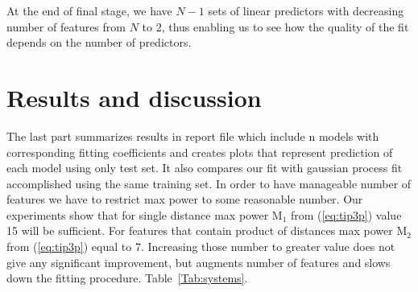 \documentclass[aps,prl,reprint,amsmath,amssymb,nature]{revtex4-1}
\begin{document}
At the end of final stage, we have $N-1$ sets of linear predictors with decreasing number of features from $N$ to 2, thus enabling us to see how the quality of the fit depends on the number of predictors.



\section{Results and discussion}

The last part summarizes results in report file which include n models 
with corresponding fitting coefficients and creates plots that represent 
prediction of each model using only test set. It also compares our fit 
with gaussian process fit accomplished using the same training set. In 
order to have manageable number of features we have to restrict max power to some reasonable number. Our experiments show that for single distance max power M$_{1}$ from (\ref{eq:tip3p}) value 15 will be sufficient. For features that contain product of distances max power M$_{2}$ from (\ref{eq:tip3p}) 
equal to 7. Increasing those number to greater value does not give any 
significant improvement, but augments number of features and slows down 
the fitting procedure. Table~\ref{Tab:systems}.
\end{document}
